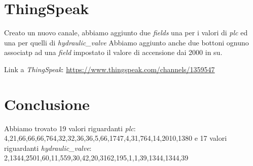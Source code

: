 \documentclass{article}
\begin{document}
\section{ThingSpeak}
Creato un nuovo canale, abbiamo aggiunto due \textit{fields} una per i valori di \textit{plc} ed una per quelli di \textit{hydraulic\_valve} \hfill \break
Abbiamo aggiunto anche due bottoni ognuno associatp ad una \textit{field} impostato il valore di accensione dai 2000 in su.

\hfill \break 
Link a \textit{ThingSpeak}:  \href{https://www.thingspeak.com/channels/1359547}{https://www.thingspeak.com/channels/1359547}

\section{Conclusione}
Abbiamo trovato 19 valori riguardanti \textit{plc}: 4,21,66,66,66,764,32,32,36,36,5,66,1747,4,31,764,14,2010,1380 \hfill \break 
e 17 valori riguardanti \textit{hydraulic\_valve}: 2,1344,2501,60,11,559,30,42,20,3162,195,1,1,39,1344,1344,39
\end{document}
